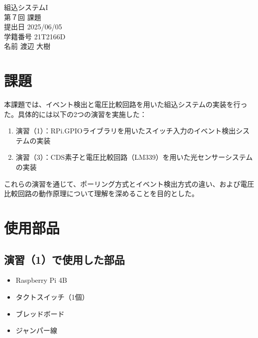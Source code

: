\documentclass[a4paper,11pt,dvipdfmx]{jsarticle}
\begin{document}

\begin{titlepage}
\noindent
\vspace{4cm}
\begin{center}
\begin{LARGE}
組込システムI \\
第７回  課題 \\
\vspace{8cm}
提出日  2025/06/05 \\
学籍番号  21T2166D \\
名前  渡辺 大樹 \\
\end{LARGE}
\end{center}
\end{titlepage}
\setcounter{page}{1}

\section{課題}
本課題では、イベント検出と電圧比較回路を用いた組込システムの実装を行った。具体的には以下の2つの演習を実施した：

\begin{enumerate}
\item 演習（1）：RPi.GPIOライブラリを用いたスイッチ入力のイベント検出システムの実装
\item 演習（3）：CDS素子と電圧比較回路（LM339）を用いた光センサーシステムの実装
\end{enumerate}

これらの演習を通じて、ポーリング方式とイベント検出方式の違い、および電圧比較回路の動作原理について理解を深めることを目的とした。

\section{使用部品}
\subsection{演習（1）で使用した部品}
\begin{itemize}
\item Raspberry Pi 4B
\item タクトスイッチ（1個）
\item ブレッドボード
\item ジャンパー線
\end{itemize}
\end{document}

